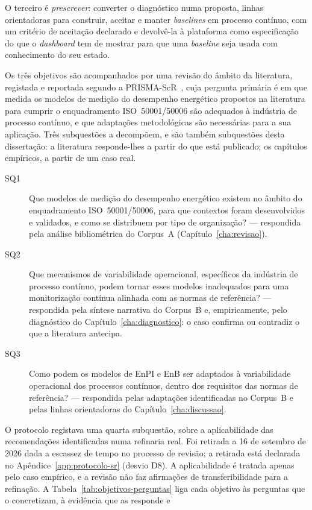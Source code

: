 O terceiro é \emph{prescrever}: converter o diagnóstico numa proposta,
linhas orientadoras para construir, aceitar e manter \emph{baselines}
em processo contínuo, com um critério de aceitação declarado
 e devolvê-la à plataforma
como especificação do que o \emph{dashboard} tem de mostrar para que uma
\emph{baseline} seja usada com conhecimento do seu estado.

Os três objetivos são acompanhados por uma revisão do
âmbito da literatura, registada e reportada segundo a
PRISMA-ScR~\cite{Tricco2018}, cuja pergunta primária é em que medida os
modelos de medição do desempenho energético propostos na literatura para
cumprir o enquadramento ISO~50001/50006 são adequados à indústria de
processo contínuo, e que adaptações metodológicas são necessárias para a
sua aplicação. Três subquestões a decompõem, e são também subquestões
desta dissertação: a literatura responde-lhes a partir do que está
publicado; os capítulos empíricos, a partir de um caso real.

\begin{description}
  \item[SQ1] Que modelos de medição do desempenho energético existem no
    âmbito do enquadramento ISO~50001/50006, para que contextos foram
    desenvolvidos e validados, e como se distribuem por tipo de
    organização? --- respondida pela análise bibliométrica do Corpus~A
    (Capítulo~\ref{cha:revisao}).
  \item[SQ2] Que mecanismos de variabilidade operacional, específicos da
    indústria de processo contínuo, podem tornar esses modelos
    inadequados para uma monitorização contínua alinhada com as normas
    de referência? --- respondida pela síntese narrativa do Corpus~B e,
    empiricamente, pelo diagnóstico do Capítulo~\ref{cha:diagnostico}: o
    caso confirma ou contradiz o que a literatura antecipa.
  \item[SQ3] Como podem os modelos de EnPI e EnB ser adaptados à
    variabilidade operacional dos processos contínuos, dentro dos
    requisitos das normas de referência? --- respondida pelas
    adaptações identificadas no Corpus~B e pelas linhas orientadoras do
    Capítulo~\ref{cha:discussao}.
\end{description}

O protocolo registava uma quarta subquestão, sobre a aplicabilidade das
recomendações identificadas numa refinaria real. Foi retirada a 16 de
setembro de 2026 dada a escassez de tempo no processo de revisão; a retirada está declarada no
Apêndice~\ref{app:protocolo-sr} (desvio D8). A aplicabilidade é tratada
apenas pelo caso empírico, e a revisão não faz afirmações de
transferibilidade para a refinação. A Tabela~\ref{tab:objetivos-perguntas}
liga cada objetivo às perguntas que o concretizam, à evidência que as
responde e 

